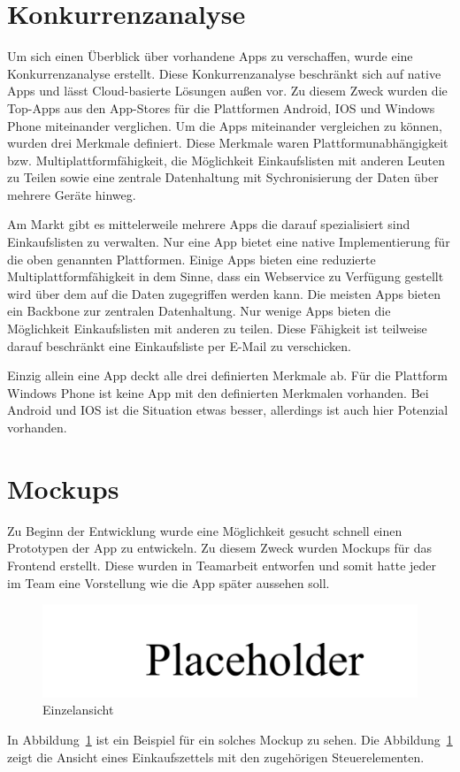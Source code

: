 \documentclass[10pt, conference, compsocconf]{IEEEtran}
\begin{document}
\section{Konkurrenzanalyse}
Um sich einen \"Uberblick \"uber vorhandene Apps zu verschaffen, wurde eine Konkurrenzanalyse erstellt.
Diese Konkurrenzanalyse beschr\"ankt sich auf native Apps und l\"asst Cloud-basierte L\"osungen au{\ss}en vor.
Zu diesem Zweck wurden die Top-Apps aus den App-Stores f\"ur die Plattformen Android, IOS und Windows Phone miteinander verglichen.
Um die Apps miteinander vergleichen zu k\"onnen, wurden drei Merkmale definiert. 
Diese Merkmale waren Plattformunabh\"angigkeit bzw. Multiplattformf\"ahigkeit, 
die M\"oglichkeit Einkaufslisten mit anderen Leuten zu Teilen sowie eine zentrale Datenhaltung mit Sychronisierung der Daten \"uber mehrere Ger\"ate hinweg.

Am Markt gibt es mittelerweile mehrere Apps die darauf spezialisiert sind Einkaufslisten zu verwalten.
Nur eine App bietet eine native Implementierung f\"ur die oben genannten Plattformen. Einige Apps bieten eine reduzierte Multiplattformf\"ahigkeit in dem Sinne, dass ein Webservice zu Verf\"ugung gestellt wird \"uber dem auf die Daten zugegriffen werden kann.
Die meisten Apps bieten ein Backbone zur zentralen Datenhaltung.
Nur wenige Apps bieten die M\"oglichkeit Einkaufslisten mit anderen zu teilen. Diese F\"ahigkeit ist teilweise darauf beschr\"ankt eine Einkaufsliste per E-Mail zu 
verschicken.

Einzig allein eine App deckt alle drei definierten Merkmale ab. 
F\"ur die Plattform Windows Phone ist keine App mit den definierten Merkmalen vorhanden.
Bei Android und IOS ist die Situation etwas besser, allerdings ist auch hier Potenzial vorhanden.

\section{Mockups}
Zu Beginn der Entwicklung wurde eine M\"oglichkeit gesucht schnell einen Prototypen der App zu entwickeln.
Zu diesem Zweck wurden Mockups f\"ur das Frontend erstellt. 
Diese wurden in Teamarbeit entworfen und somit hatte jeder im Team eine Vorstellung wie die App sp\"ater aussehen soll.
\begin{figure}[h!]
	\centering
	\includegraphics[scale=0.3]{./Bilder_Zeichnungen/placeholder.pdf}
	\caption{Einzelansicht}
	\label{fig:Mockup_Einzelansicht}
\end{figure}
In Abbildung~\ref{fig:Mockup_Einzelansicht} ist ein Beispiel f\"ur ein solches Mockup zu sehen. Die Abbildung~\ref{fig:Mockup_Einzelansicht} zeigt die Ansicht eines Einkaufszettels mit den zugeh\"origen Steuerelementen.
\end{document}
